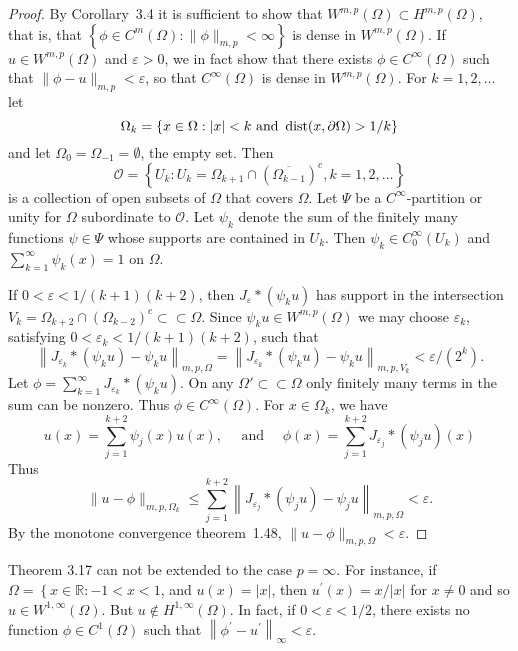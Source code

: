 \begin{proof}
  By Corollary~3.4 it is sufficient to show that $W^{m,p}(\Omega) \subset H^{m, p}(\Omega)$,
  that is, that $\left\{\phi \in C^m(\Omega):\|\phi\|_{m, p}<\infty\right\}$
  is dense in $W^{m,p}(\Omega)$. If $u \in W^{m, p}(\Omega)$ and $\varepsilon>0$,
  we in fact show that there exists $\phi \in C^{\infty}(\Omega)$
  such that $\|\phi-u\|_{m, p}<\varepsilon$, so that $C^{\infty}(\Omega)$ is dense
  in $W^{m,p}(\Omega)$. For $k=1,2, \ldots$ let
  \[
  \Omega_k=\{x \in \Omega:|x|<k \text { and } \operatorname{dist}(x, \partial\Omega)>1/k\}
  \]
  and let $\Omega_0=\Omega_{-1}=\emptyset$, the empty set. Then
  \[
  \mathscr{O} = \left\{U_k: U_k=\Omega_{k+1} \cap\left(\overline{\Omega_{k-1}}\right)^c, k=1,2, \ldots\right\}
  \]
  is a collection of open subsets of $\Omega$ that covers $\Omega$.
  Let $\Psi$ be a $C^{\infty}$-partition or unity for $\Omega$ subordinate to $\mathscr{O}$.
  Let $\psi_k$ denote the sum of the finitely many functions $\psi \in \Psi$ whose supports are 
  contained in $U_k$.
  Then $\psi_k \in C_0^{\infty}\left(U_k\right)$ and $\sum_{k=1}^{\infty} \psi_k(x)=1$ on $\Omega$.
  
  If $0<\varepsilon<1 /(k+1)(k+2)$, then $J_\varepsilon *\left(\psi_k u\right)$ has support in the 
  intersection $V_k=\Omega_{k+2} \cap\left(\Omega_{k-2}\right)^c \subset\subset \Omega$.
  Since $\psi_k u \in W^{m, p}(\Omega)$ we may choose $\varepsilon_k$,
  satisfying $0<\varepsilon_k<1 /(k+1)(k+2)$, such that
  \[
    \left\|J_{\varepsilon_k} *\left(\psi_k u\right)-\psi_k u\right\|_{m, p, \Omega}=\left\|J_{\varepsilon_k} *\left(\psi_k u\right)-\psi_k u\right\|_{m, p, V_k}<\varepsilon /(2^k) .
  \]
  Let $\phi=\sum_{k=1}^{\infty} J_{\varepsilon_k} *\left(\psi_k u\right)$.
  On any $\Omega' \subset\subset \Omega$ only finitely many terms in the sum can be nonzero.
  Thus $\phi \in C^{\infty}(\Omega)$. For $x \in \Omega_k$, we have
  \[
    u(x)=\sum_{j=1}^{k+2} \psi_j(x) u(x), \quad \text { and } \quad \phi(x)=\sum_{j=1}^{k+2} J_{\varepsilon_j} *\left(\psi_j u\right)(x)
  \]
  Thus
  \[
    \|u-\phi\|_{m, p, \Omega_k} \leq \sum_{j=1}^{k+2}\left\|J_{\varepsilon_j} *\left(\psi_j u\right)-\psi_j u\right\|_{m, p, \Omega}<\varepsilon .
  \]
  By the monotone convergence theorem~1.48, $\|u-\phi\|_{m, p, \Omega}<\varepsilon$.
\end{proof}


\begin{example}
  Theorem 3.17 can not be extended to the case $p=\infty$.
  For instance, if $\Omega=\left\{x \in \mathbb{R}:-1<x<1\right.$,
  and $u(x)=|x|$, then $u^{\prime}(x)=x /|x|$ for $x \neq 0$ and so $u \in W^{1, \infty}(\Omega)$. 
  But $u \notin H^{1,\infty}(\Omega)$. In fact, if $0<\varepsilon<1 / 2$,
  there exists no function $\phi \in C^1(\Omega)$ such that $\left\|\phi^{\prime}-u^{\prime}\right\|_{\infty}<\varepsilon$.
\end{example}


